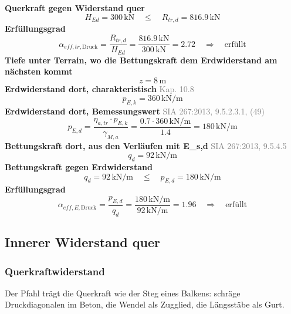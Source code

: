 \documentclass[11pt,a4paper]{article}
\newcommand{\normref}[1]{{\small\textcolor{gray}{#1}}}
\begin{document}
\noindent\textbf{Querkraft gegen Widerstand quer}
\begin{equation*}
H_{Ed} = 300\,\mathrm{kN} \quad \le \quad R_{tr,d} = 816.9\,\mathrm{kN}
\end{equation*}
\noindent\textbf{Erfüllungsgrad}
\begin{equation*}
\alpha_{eff,tr,\text{Druck}} = \frac{R_{tr,d}}{H_{Ed}} = \frac{816.9\,\mathrm{kN}}{300\,\mathrm{kN}} = 2.72 \quad \Rightarrow \quad \text{erfüllt}
\end{equation*}
\noindent\textbf{Tiefe unter Terrain, wo die Bettungskraft dem Erdwiderstand am nächsten kommt}
\begin{equation*}
z = 8\,\mathrm{m}
\end{equation*}
\noindent\textbf{Erdwiderstand dort, charakteristisch} \hfill \normref{Kap. 10.8}
\begin{equation*}
p_{E,k} = 360\,\mathrm{kN}/\mathrm{m}
\end{equation*}
\noindent\textbf{Erdwiderstand dort, Bemessungswert} \hfill \normref{SIA 267:2013, 9.5.2.3.1, (49)}
\begin{equation*}
p_{E,d} = \frac{\eta_{a,tr} \cdot p_{E,k}}{\gamma_{M,a}} = \frac{0.7 \cdot 360\,\mathrm{kN}/\mathrm{m}}{1.4} = 180\,\mathrm{kN}/\mathrm{m}
\end{equation*}
\noindent\textbf{Bettungskraft dort, aus den Verläufen mit E\_s,d} \hfill \normref{SIA 267:2013, 9.5.4.5}
\begin{equation*}
q_d = 92\,\mathrm{kN}/\mathrm{m}
\end{equation*}
\noindent\textbf{Bettungskraft gegen Erdwiderstand}
\begin{equation*}
q_d = 92\,\mathrm{kN}/\mathrm{m} \quad \le \quad p_{E,d} = 180\,\mathrm{kN}/\mathrm{m}
\end{equation*}
\noindent\textbf{Erfüllungsgrad}
\begin{equation*}
\alpha_{eff,E,\text{Druck}} = \frac{p_{E,d}}{q_d} = \frac{180\,\mathrm{kN}/\mathrm{m}}{92\,\mathrm{kN}/\mathrm{m}} = 1.96 \quad \Rightarrow \quad \text{erfüllt}
\end{equation*}
\subsection{Innerer Widerstand quer}
\subsubsection{Querkraftwiderstand}
Der Pfahl trägt die Querkraft wie der Steg eines Balkens: schräge Druckdiagonalen im Beton, die Wendel als Zugglied, die Längsstäbe als Gurt.
\end{document}
